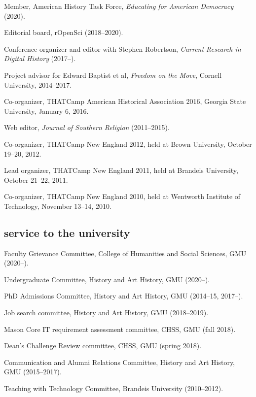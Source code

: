 \documentclass[11pt]{article}
\begin{document}
Member, American History Task Force, \emph{Educating for American Democracy} (2020).

Editorial board, rOpenSci (2018--2020).

Conference organizer and editor with Stephen Robertson, \emph{Current Research 
  in Digital History} (2017--).

Project advisor for Edward Baptist et al, \emph{Freedom on the Move}, Cornell 
University, 2014--2017.

Co-organizer, THATCamp American Historical Association 2016, Georgia State University, January 6, 2016.

Web editor, \emph{Journal of Southern Religion} (2011--2015).

Co-organizer, THATCamp New England 2012, held at Brown University,
October 19--20, 2012.

Lead organizer, THATCamp New England 2011, held at Brandeis University,
October 21--22, 2011.

Co-organizer, THATCamp New England 2010, held at Wentworth Institute of
Technology, November 13--14, 2010.


\subsection{service to the university}\label{service-university}

Faculty Grievance Committee, College of Humanities and Social Sciences, GMU (2020--).

Undergraduate Committee, History and Art History, GMU (2020--).

PhD Admissions Committee, History and Art History, GMU (2014--15, 2017--).

Job search committee, History and Art History, GMU (2018--2019).

Mason Core IT requirement assessment committee, CHSS, GMU (fall 2018).

Dean's Challenge Review committee, CHSS, GMU (spring 2018).

Communication and Alumni Relations Committee, History and Art History, GMU 
(2015--2017).

Teaching with Technology Committee, Brandeis University (2010--2012).


\end{document}

